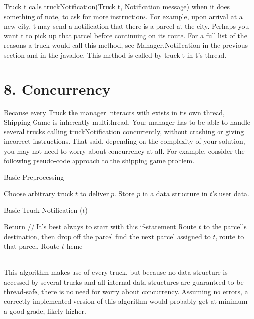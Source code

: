 \documentclass[11pt]{article}
\begin{document}
Truck t calls truckNotification(Truck t, Notification message) when it does something of note, to ask for more instructions. For example, upon arrival at a new city, t may send a notification that there is a parcel at the city. Perhaps you want t to pick up that parcel before continuing on its route. For a full list of the reasons a truck would call this method, see Manager.Notification in the previous section and in the javadoc. This method is called by truck t in t's thread. 


\section{8. Concurrency}
Because every Truck the manager interacts with exists in its own thread, Shipping Game is inherently multithread. Your manager has to be able to handle several trucks calling truckNotification concurrently, without crashing or giving incorrect instructions. That said, depending on the complexity of your solution, you may not need to worry about concurrency at all. For example, consider the following pseudo-code approach to the shipping game problem.
\begin{algorithm}
\caption{Basic Preprocessing} \label{alg:ls}
\begin{algorithmic}[1]
\STATE Choose arbitrary truck $t$ to deliver $p$. Store $p$ in a data structure in $t$'s user data.
\ENDFOR
\end{algorithmic}
\end{algorithm}
\begin{algorithm}
\caption{Basic Truck Notification ($t$)} \label{alg:ls}
\begin{algorithmic}[1]
\STATE Return      // It's best always to start with this if-statement
\ENDIF
{}
\STATE Route $t$ to the parcel's destination, then drop off the parcel
\ELSE
\STATE find the next parcel assigned to $t$, route to that parcel.
\ENDIF
\ELSE
\STATE Route $t$ home
\ENDIF
\end{algorithmic}
\end{algorithm}
\\

This algorithm makes use of every truck, but because no data structure is accessed by several trucks and all internal data structures are guaranteed to be thread-safe, there is no need for worry about concurrency. Assuming no errors, a correctly implemented version of this algorithm  would probably get at minimum a good grade, likely higher.\\
\end{document}

